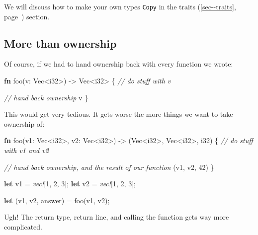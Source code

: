 \documentclass[a4paper,]{book}
\renewcommand*{\hyperref}[2][\ar]{%
  \def\ar{#2}%
  #2 (\autoref{#1}, page~\pageref{#1})}
\newenvironment{Shaded}{\begin{snugshade}}{\end{snugshade}}
\newcommand{\KeywordTok}[1]{\textcolor[rgb]{0.13,0.29,0.53}{\textbf{{#1}}}}
\newcommand{\DataTypeTok}[1]{\textcolor[rgb]{0.13,0.29,0.53}{{#1}}}
\newcommand{\DecValTok}[1]{\textcolor[rgb]{0.00,0.00,0.81}{{#1}}}
\newcommand{\CommentTok}[1]{\textcolor[rgb]{0.56,0.35,0.01}{\textit{{#1}}}}
\newcommand{\PreprocessorTok}[1]{\textcolor[rgb]{0.56,0.35,0.01}{\textit{{#1}}}}
\newcommand{\NormalTok}[1]{{#1}}
\begin{document}
We will discuss how to make your own types \texttt{Copy} in the
\hyperref[sec--traits]{traits} section.

\subsection{More than ownership}\label{more-than-ownership}

Of course, if we had to hand ownership back with every function we
wrote:

\begin{Shaded}
\begin{Highlighting}[]
\KeywordTok{fn} \NormalTok{foo(v: }\DataTypeTok{Vec}\NormalTok{<}\DataTypeTok{i32}\NormalTok{>) -> }\DataTypeTok{Vec}\NormalTok{<}\DataTypeTok{i32}\NormalTok{> \{}
    \CommentTok{// do stuff with v}

    \CommentTok{// hand back ownership}
    \NormalTok{v}
\NormalTok{\}}
\end{Highlighting}
\end{Shaded}

This would get very tedious. It gets worse the more things we want to
take ownership of:

\begin{Shaded}
\begin{Highlighting}[]
\KeywordTok{fn} \NormalTok{foo(v1: }\DataTypeTok{Vec}\NormalTok{<}\DataTypeTok{i32}\NormalTok{>, v2: }\DataTypeTok{Vec}\NormalTok{<}\DataTypeTok{i32}\NormalTok{>) -> (}\DataTypeTok{Vec}\NormalTok{<}\DataTypeTok{i32}\NormalTok{>, }\DataTypeTok{Vec}\NormalTok{<}\DataTypeTok{i32}\NormalTok{>, }\DataTypeTok{i32}\NormalTok{) \{}
    \CommentTok{// do stuff with v1 and v2}

    \CommentTok{// hand back ownership, and the result of our function}
    \NormalTok{(v1, v2, }\DecValTok{42}\NormalTok{)}
\NormalTok{\}}

\KeywordTok{let} \NormalTok{v1 = }\PreprocessorTok{vec!}\NormalTok{[}\DecValTok{1}\NormalTok{, }\DecValTok{2}\NormalTok{, }\DecValTok{3}\NormalTok{];}
\KeywordTok{let} \NormalTok{v2 = }\PreprocessorTok{vec!}\NormalTok{[}\DecValTok{1}\NormalTok{, }\DecValTok{2}\NormalTok{, }\DecValTok{3}\NormalTok{];}

\KeywordTok{let} \NormalTok{(v1, v2, answer) = foo(v1, v2);}
\end{Highlighting}
\end{Shaded}

Ugh! The return type, return line, and calling the function gets way
more complicated.
\end{document}
